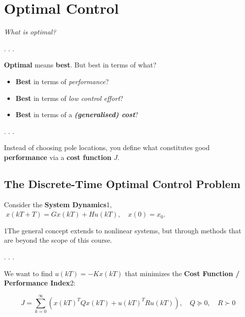 \documentclass[
  letterpaper,
  DIV=11,
  numbers=noendperiod,
  oneside]{scrartcl}
\providecommand{\tightlist}{%
  \setlength{\itemsep}{0pt}\setlength{\parskip}{0pt}}
\begin{document}
\section{Optimal Control}\label{optimal-control}

\emph{What is optimal?}

. . .

\textbf{Optimal} means \textbf{best}. But best in terms of what?

\begin{itemize}
\tightlist
\item
  \textbf{Best} in terms of \emph{performance}?
\item
  \textbf{Best} in terms of \emph{low control effort}?
\item
  \textbf{Best} in terms of a \textbf{\emph{{(generalised)} cost}}?
\end{itemize}

. . .

\begin{tcolorbox}[enhanced jigsaw, rightrule=.15mm, coltitle=black, titlerule=0mm, breakable, title=\textcolor{quarto-callout-tip-color}{\faLightbulb}\hspace{0.5em}{Key Idea:}, bottomrule=.15mm, colback=white, toprule=.15mm, opacityback=0, opacitybacktitle=0.6, leftrule=.75mm, left=2mm, colbacktitle=quarto-callout-tip-color!10!white, bottomtitle=1mm, toptitle=1mm, arc=.35mm, colframe=quarto-callout-tip-color-frame]

Instead of choosing pole locations, you define what constitutes good
\textbf{performance} via a \textbf{cost function} \(J\).

\end{tcolorbox}

\subsection{The Discrete-Time Optimal Control
Problem}\label{the-discrete-time-optimal-control-problem}

Consider the \textbf{System Dynamics}1,
\(\; x(kT+T) = Gx(kT) + Hu(kT), \quad x(0) = x_0\).

1The general concept extends to nonlinear systems, but through methods
that are beyond the scope of this course.

. . .

We want to find \(u(kT) = -Kx(kT)\) that minimizes the \textbf{Cost
Function / Performance Index}2:

\[
J = \sum_{k=0}^{\infty} \left( x(kT)^T Q x(kT) + u(kT)^T R u(kT) \right), \quad Q\succeq 0, \quad R\succ 0
\]
\end{document}
